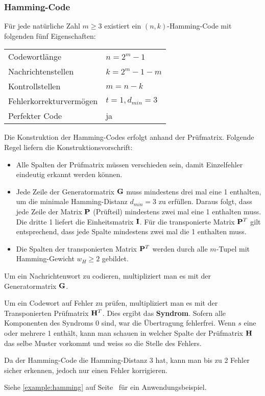 \subsubsection{Hamming-Code}

Für jede natürliche Zahl $m \ge 3$ existiert ein $(n,k)$-Hamming-Code mit folgenden
fünf Eigenschaften:

\begin{center}
\begin{tabular}[H]{ll}
	\hline
	Codewortlänge & $n = 2^m - 1$ \\
	Nachrichtenstellen & $k = 2^m - 1 - m$ \\
	Kontrollstellen & $m = n - k$ \\
	Fehlerkorrekturvermögen & $t = 1, d_{min} = 3$ \\
	Perfekter Code & ja \\
	\hline
\end{tabular}
\end{center}

Die Konstruktion der Hamming-Codes erfolgt anhand der Prüfmatrix. Folgende Regel
liefern die Konstruktionsvorschrift:
\begin{itemize}
	\item Alle Spalten der Prüfmatrix müssen verschieden sein, damit Einzelfehler
		eindeutig erkannt werden können.
	\item Jede Zeile der Generatormatrix $\mathbf{G}$ muss mindestens drei mal eine 1
		enthalten, um die minimale Hamming-Distanz $d_{min} = 3$ zu erfüllen. Daraus
		folgt, dass jede Zeile der Matrix $\mathbf{P}$ (Prüfteil) mindestens zwei mal
		eine 1 enthalten muss. Die dritte 1 liefert die Einheitsmatrix $\mathbf{I}$.
		Für die transponierte Matrix $\mathbf{P}^T$ gilt entsprechend, dass jede Spalte
		mindestens zwei mal die 1 enthalten muss.
	\item Die Spalten der transponierten Matrix $\mathbf{P}^T$ werden durch alle
		$m$-Tupel mit Hamming-Gewicht $w_H \ge 2$ gebildet.
\end{itemize}

Um ein Nachrichtenwort zu codieren, multipliziert man es mit der Generatormatrix
$\mathbf{G}$.

Um ein Codewort auf Fehler zu prüfen, multipliziert man es mit der
Transponierten Prüfmatrix $\mathbf{H}^T$. Dies ergibt das \textbf{Syndrom}. Sofern
alle Komponenten des Syndroms 0 sind, war die Übertragung fehlerfrei.  Wenn $s$
eine oder mehrere 1 enthält, kann man schauen in welcher Spalte der Prüfmatrix
$\mathbf{H}$ das selbe Muster vorkommt und weiss so die Stelle des Fehlers.

Da der Hamming-Code die Hamming-Distanz 3 hat, kann man bis zu 2 Fehler sicher
erkennen, jedoch nur einen Fehler korrigieren.

Siehe \autoref{example:hamming} auf Seite~\pageref{example:hamming} für ein
Anwendungsbeispiel.
